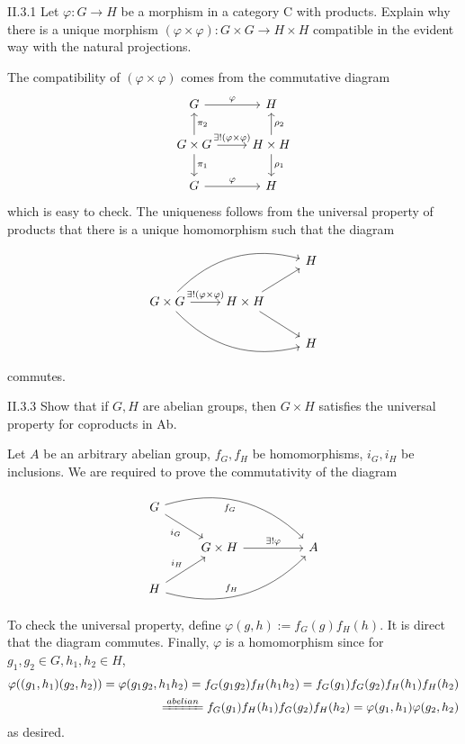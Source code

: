 \section{}

\begin{problem}{II.3.1}
Let $\varphi: G \to H$ be a morphism in a category \textsf{C} with products. Explain why there is a unique morphism $(\varphi \times \varphi) : G \times G \to H \times H$ compatible in the evident way with the natural projections.  
\end{problem}
\begin{sol}
The compatibility of $(\varphi \times \varphi)$ comes from the commutative diagram
\[
\begin{tikzcd}
G \arrow[r, "\varphi"]    & H          \\
G \times G \arrow[r, "\exists!(\varphi \times \varphi)"] \arrow[d, "\pi_1"] \arrow[u, "\pi_2"'] & H \times H \arrow[d, "\rho_1"] \arrow[u, "\rho_2"'] \\
G \arrow[r, "\varphi"]  & H   
\end{tikzcd}  
\]
which is easy to check. The uniqueness follows from the universal property of products that there is a unique homomorphism such that the diagram
\[
\begin{tikzcd}
&   & H \\
G \times G \arrow[rru, bend left] \arrow[rrd, bend right] \arrow[r, "\exists ! (\varphi \times \varphi)"] & H \times H \arrow[ru] \arrow[rd] &   \\
&   & H
\end{tikzcd}
\]
commutes.
\end{sol}

\begin{problem}{II.3.3}
Show that if $G, H$ are abelian groups, then $G \times H$ satisfies the universal property for coproducts in \textsf{Ab}.
\end{problem}
\begin{pf} 
Let $A$ be an arbitrary abelian group, $f_G, f_H$ be homomorphisms, $i_G, i_H$ be inclusions. We are required to prove the commutativity of the diagram
\[
\begin{tikzcd}
G \arrow[rrrd, "f_G"', bend left] \arrow[rd, "i_G"'] &                                          &  &   \\
& G \times H \arrow[rr, "\exists!\varphi"] &  & A \\
H \arrow[rrru, "f_H", bend right] \arrow[ru, "i_H"]  &                                          &  &  
\end{tikzcd}
\]
To check the universal property, define $\varphi(g,h) := f_G(g)f_H(h)$. It is direct that the diagram commutes. Finally, $\varphi$ is a homomorphism since for $g_1,g_2 \in G, h_1,h_2 \in H$,
\[
\begin{split}
\varphi((g_1,h_1)(g_2,h_2)) = \varphi(g_1g_2,h_1h_2) = f_G(g_1g_2)f_H(h_1h_2) = f_G(g_1)f_G(g_2)f_H(h_1)f_H(h_2) \\ 
\xlongequal{abelian} f_G(g_1)f_H(h_1)f_G(g_2)f_H(h_2) = \varphi(g_1,h_1)\varphi(g_2,h_2)
\end{split}
\]
as desired.
\end{pf}


